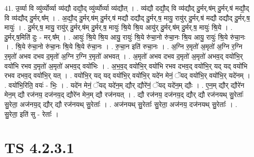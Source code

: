 \documentclass[17pt]{extarticle}
\begin{document}
41. उ॒र्व्या वि व्यु॑र्व्योर्व्या व्य॑द्यौ दद्यौ॒द् व्यु॑र्व्योर्व्या व्य॑द्यौत् । . व्य॑द्यौ दद्यौ॒द् वि व्य॑द्यौद् दु॒र्मर्.ष॑म् दु॒र्मर्.ष॑ मद्यौ॒द् वि व्य॑द्यौद् दु॒र्मर्.ष᳚म् । . अ॒द्यौ॒द् दु॒र्मर्.ष॑म् दु॒र्मर्.ष॑ मद्यौ दद्यौद् दु॒र्मर्.ष॒ मायु॒ रायु॑र् दु॒र्मर्.ष॑ मद्यौ दद्यौद् दु॒र्मर्.ष॒ मायुः॑ । . दु॒र्मर्.ष॒ मायु॒ रायु॑र् दु॒र्मर्.ष॑म् दु॒र्मर्.ष॒ मायुः॑ श्रि॒ये श्रि॒य आयु॑र् दु॒र्मर्.ष॑म् दु॒र्मर्.ष॒ मायुः॑ श्रि॒ये । . दु॒र्मर्.ष॒मिति॑ दुः - मर्.ष᳚म् । . आयुः॑ श्रि॒ये श्रि॒य आयु॒ रायुः॑ श्रि॒ये रु॑चा॒नो रु॑चा॒नः श्रि॒य आयु॒ रायुः॑ श्रि॒ये रु॑चा॒नः । . श्रि॒ये रु॑चा॒नो रु॑चा॒नः श्रि॒ये श्रि॒ये रु॑चा॒नः । . रु॒चा॒न इति॑ रुचा॒नः । . अ॒ग्नि र॒मृतो॑ अ॒मृतो॑ अ॒ग्नि र॒ग्नि र॒मृतो॑ अभव दभव द॒मृतो॑ अ॒ग्नि र॒ग्नि र॒मृतो॑ अभवत् । . अ॒मृतो॑ अभव दभव द॒मृतो॑ अ॒मृतो॑ अभव॒द् वयो॑भि॒र् वयो॑भि रभव द॒मृतो॑ अ॒मृतो॑ अभव॒द् वयो॑भिः । . अ॒भ॒व॒द् वयो॑भि॒र् वयो॑भि रभव दभव॒द् वयो॑भि॒र् यद् यद् वयो॑भि रभव दभव॒द् वयो॑भि॒र् यत् । . वयो॑भि॒र् यद् यद् वयो॑भि॒र् वयो॑भि॒र् यदे॑न मेनं॒ ॅयद् वयो॑भि॒र् वयो॑भि॒र् यदे॑नम् । . वयो॑भि॒रिति॒ वयः॑ - भिः॒ । . यदे॑न मेनं॒ ॅयद् यदे॑न॒म् द्यौर् द्यौरे॑नं॒ ॅयद् यदे॑न॒म् द्यौः । . ए॒न॒म् द्यौर् द्यौरे॑न मेन॒म् द्यौ रज॑नय॒ दज॑नय॒द् द्यौरे॑न मेन॒म् द्यौ रज॑नयत् । . द्यौ रज॑नय॒ दज॑नय॒द् द्यौर् द्यौ रज॑नयथ् सु॒रेताः᳚ सु॒रेता॒ अज॑नय॒द् द्यौर् द्यौ रज॑नयथ् सु॒रेताः᳚ । . अज॑नयथ् सु॒रेताः᳚ सु॒रेता॒ अज॑नय॒ दज॑नयथ् सु॒रेताः᳚ । . सु॒रेता॒ इति॑ सु - रेताः᳚ । \newline
\pagebreak
{}

\section{ TS 4.2.3.1 }
\end{document}
